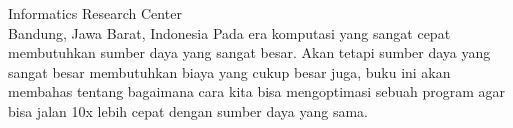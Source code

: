 

{Informatics Research Center\\
Bandung, Jawa Barat, Indonesia}
Pada era komputasi yang sangat cepat membutuhkan sumber daya yang sangat besar. Akan tetapi sumber daya yang sangat besar membutuhkan biaya yang cukup besar juga, buku ini akan membahas tentang bagaimana cara kita bisa mengoptimasi sebuah program agar bisa jalan 10x lebih cepat dengan sumber daya yang sama.
